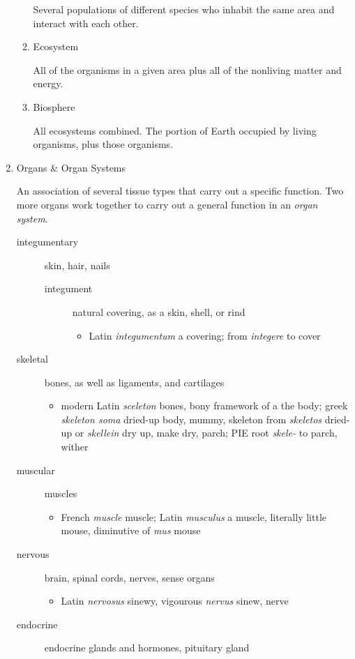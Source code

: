 \documentclass[11pt]{article}
\begin{document}
\begin{enumerate}
\begin{enumerate}
Several populations of different species who inhabit the same area and
interact with each other.

\item Ecosystem

All of the organisms in a given area plus all of the nonliving matter and
energy.

\item Biosphere

All ecosystems combined. The portion of Earth occupied by living organisms,
plus those organisms.
\end{enumerate}

\item Organs \& Organ Systems
\label{sec:org8cc25d2}

An association of several tissue types that carry out a specific function.
Two more organs work together to carry out a general function in an \emph{organ
system}.

\begin{description}
\item[{integumentary}] skin, hair, nails
\begin{description}
\item[{integument}] natural covering, as a skin, shell, or rind
\begin{itemize}
\item Latin \emph{integumentum} a covering; from \emph{integere} to cover
\end{itemize}
\end{description}
\item[{skeletal}] bones, as well as ligaments, and cartilages
\begin{itemize}
\item modern Latin \emph{sceleton} bones, bony framework of a the body; greek
\emph{skeleton soma} dried-up body, mummy, skeleton from \emph{skeletos} dried-up
or \emph{skellein} dry up, make dry, parch; PIE root \emph{skele-} to parch, wither
\end{itemize}
\item[{muscular}] muscles
\begin{itemize}
\item French \emph{muscle} muscle; Latin \emph{musculus} a muscle, literally little
mouse, diminutive of \emph{mus} mouse
\end{itemize}
\item[{nervous}] brain, spinal cords, nerves, sense organs
\begin{itemize}
\item Latin \emph{nervosus} sinewy, vigourous \emph{nervus} sinew, nerve
\end{itemize}
\item[{endocrine}] endocrine glands and hormones, pituitary gland


\end{description}
\end{enumerate}
\end{document}
